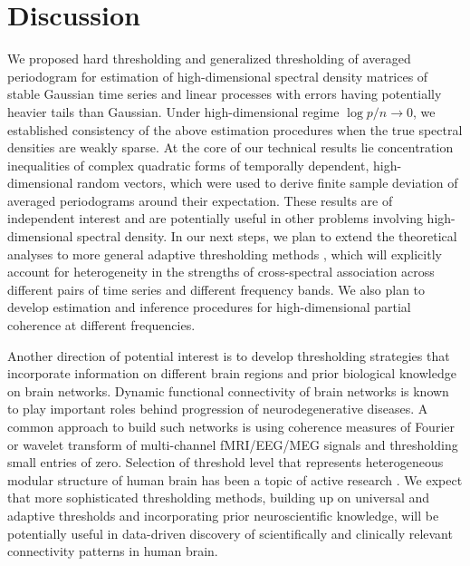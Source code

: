 \section{Discussion}\label{sec:discussion}
We proposed hard thresholding and generalized thresholding of averaged periodogram for estimation of high-dimensional spectral density matrices of stable Gaussian time series and linear processes with errors having potentially heavier tails than Gaussian. Under high-dimensional regime $\log p /n \rightarrow 0$, we established consistency of the above estimation procedures when the true spectral densities are weakly sparse. At the core of our technical results lie concentration inequalities of  complex quadratic forms of temporally dependent, high-dimensional random vectors, which were used to derive finite sample deviation of averaged periodograms around their expectation. These results  are of independent interest and are potentially useful in other problems involving high-dimensional spectral density. In our next steps, we plan to extend the theoretical analyses to more general adaptive thresholding methods \citep{cai2011adaptive}, which will explicitly account for heterogeneity in the strengths of cross-spectral association across different pairs of time series and different frequency bands. We also plan to develop estimation and inference procedures for high-dimensional partial coherence at different frequencies.

Another direction of potential interest is to develop thresholding strategies that incorporate  information on different brain regions and prior biological knowledge on brain networks. Dynamic functional connectivity of brain networks is known to play important roles behind progression of neurodegenerative diseases. A common approach to build such networks is using coherence measures of Fourier or wavelet transform of multi-channel fMRI/EEG/MEG signals and thresholding small entries of zero. Selection of threshold level that represents heterogeneous modular structure of human brain has been a topic of active research \citep{bordier2017graph}. We expect that more sophisticated thresholding methods, building up on universal and adaptive thresholds and incorporating prior neuroscientific knowledge, will be potentially useful in  data-driven discovery of scientifically and clinically relevant connectivity patterns in human brain.
